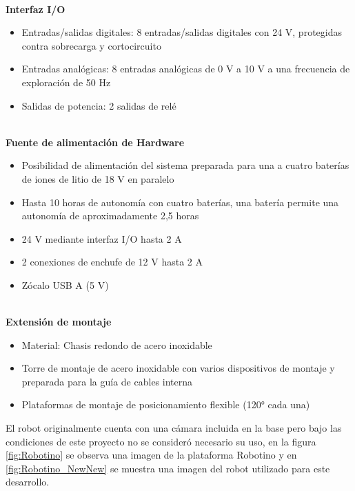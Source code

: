             \phantom{saltodelineaforzado >:D}\\
            
            \textbf{Interfaz I/O}
            \begin{itemize}
                \item Entradas/salidas digitales: 8 entradas/salidas digitales con 24 V, protegidas contra sobrecarga y cortocircuito
                \item Entradas analógicas: 8 entradas analógicas de 0 V a 10 V a una frecuencia de exploración de 50 Hz
                \item Salidas de potencia: 2 salidas de relé
            \end{itemize}

            \phantom{saltodelineaforzado >:D}\\
            
            \textbf{Fuente de alimentación de Hardware}
            \begin{itemize}
                \item Posibilidad de alimentación del sistema preparada para una a cuatro baterías de iones de litio de 18 V en paralelo
                \item Hasta 10 horas de autonomía con cuatro baterías, una batería permite una autonomía de aproximadamente 2,5 horas
                \item 24 V mediante interfaz I/O hasta 2 A
                \item 2 conexiones de enchufe de 12 V hasta 2 A
                \item Zócalo USB A (5 V)
            \end{itemize}

            \phantom{saltodelineaforzado >:D}\\
            
            \textbf{Extensión de montaje}
            \begin{itemize}
                \item Material: Chasis redondo de acero inoxidable
                \item Torre de montaje de acero inoxidable con varios dispositivos de montaje y preparada para la guía de cables interna
                \item Plataformas de montaje de posicionamiento flexible (120° cada una)
            \end{itemize}

            El robot originalmente cuenta con una cámara incluida en la base pero bajo las condiciones de este proyecto no se consideró necesario su uso, en la figura \ref{fig:Robotino} se observa una imagen de la plataforma Robotino y en \ref*{fig:Robotino_NewNew} se muestra una imagen del robot utilizado para este desarrollo.

